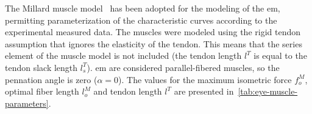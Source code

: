 \documentclass[11pt,a4paper,draft=false]{report}
\begin{document}
\begin{table}[ht]
  \centering
  \caption{Muscle path points for the six \gls{em} defined in the local frame of
    the eye globe (dimensions are given in meters).}\label{tab:eye-muscle-path}
\end{table}

The Millard muscle model~\cite{Millard2013} has been adopted for the modeling of
the \gls{em}, permitting parameterization of the characteristic curves according
to the experimental measured data. The muscles were modeled using the rigid
tendon assumption that ignores the elasticity of the tendon. This means that the
series element of the muscle model is not included (the tendon length $l^T$ is
equal to the tendon slack length $l_s^T$). \gls{em} are considered
parallel-fibered muscles, so the pennation angle is zero ($\alpha = 0$). The
values for the maximum isometric force $f_o^M$, optimal fiber length $l_o^M$ and
tendon length $l^T$ are presented in~\autoref{tab:eye-muscle-parameters}.
\end{document}
